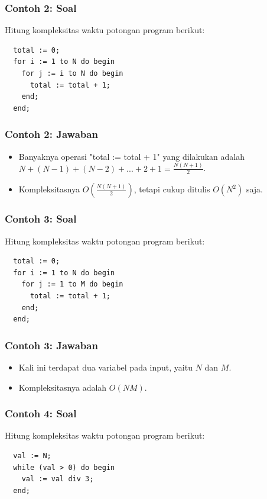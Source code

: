 \begin{frame}[fragile]
\frametitle{Contoh 2: Soal}
Hitung kompleksitas waktu potongan program berikut:

\hfill

\begin{lstlisting}
  total := 0;
  for i := 1 to N do begin
    for j := i to N do begin
      total := total + 1;
    end;
  end;
\end{lstlisting}
\end{frame}

\begin{frame}
\frametitle{Contoh 2: Jawaban}
\begin{itemize}
  \item Banyaknya operasi "total := total + 1" yang dilakukan adalah $N + (N-1) + (N-2) + ... + 2 + 1 = \frac{N(N+1)}{2}$.
  \item Kompleksitasnya $O \left( \frac{N(N+1)}{2} \right)$, tetapi cukup ditulis $O(N^2)$ saja.
\end{itemize}
\end{frame}

\begin{frame}[fragile]
\frametitle{Contoh 3: Soal}
Hitung kompleksitas waktu potongan program berikut:

\hfill

\begin{lstlisting}
  total := 0;
  for i := 1 to N do begin
    for j := 1 to M do begin
      total := total + 1;
    end;
  end;
\end{lstlisting}
\end{frame}

\begin{frame}
\frametitle{Contoh 3: Jawaban}
\begin{itemize}
  \item Kali ini terdapat dua variabel pada input, yaitu $N$ dan $M$.
  \item Kompleksitasnya adalah $O(NM)$.
\end{itemize}
\end{frame}

\begin{frame}[fragile]
\frametitle{Contoh 4: Soal}
Hitung kompleksitas waktu potongan program berikut:

\hfill

\begin{lstlisting}
  val := N;
  while (val > 0) do begin
    val := val div 3;
  end;
\end{lstlisting}
\end{frame}


